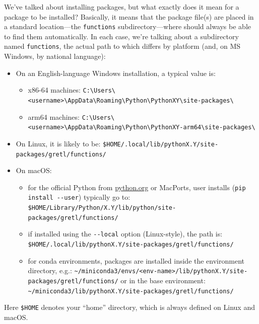 We've talked about installing packages, but what exactly does it mean
for a package to be installed? Basically, it means that the package
file(s) are placed in a standard location—the \texttt{functions}
subdirectory—where \lgretl should always be able to find them
automatically. In each case, we're talking about a subdirectory
named \texttt{functions}, the actual path to which
differs by platform (and, on MS Windows, by national language):
\begin{itemize}
	\item On an English-language Windows installation, a typical value is:\newline
		\begin{itemize}
			\item x86-64 machines:\newline
				{\footnotesize\verb|C:\Users\<username>\AppData\Roaming\Python\PythonXY\site-packages\|}
			\item arm64 machines:\newline
				{\footnotesize\verb|C:\Users\<username>\AppData\Roaming\Python\PythonXY-arm64\site-packages\|}
		\end{itemize}
	\item On Linux, it is likely to be:\newline
		{\footnotesize\verb|$HOME/.local/lib/pythonX.Y/site-packages/gretl/functions/|}
	\item On macOS:\newline
		\begin{itemize}
			\item for the official Python from \url{python.org} or MacPorts,
				user installs\linebreak
				(\verb|pip install --user|) typically go to:\newline
				{\footnotesize\verb|$HOME/Library/Python/X.Y/lib/python/site-packages/gretl/functions/|}
			\item if installed using the \verb|--local| option (Linux-style), the path is:\newline
				{\footnotesize\verb|$HOME/.local/lib/pythonX.Y/site-packages/gretl/functions/|}
			\item for conda environments, packages are installed inside the environment directory, e.g.:\newline
				{\footnotesize\verb|~/miniconda3/envs/<env-name>/lib/pythonX.Y/site-packages/gretl/functions/|}\newline
				or in the base environment:\newline
				\verb|~/miniconda3/lib/pythonX.Y/site-packages/gretl/functions/|
		\end{itemize}
\end{itemize}
Here \verb|$HOME| denotes your ``home'' directory, which is
always defined on Linux and macOS.

